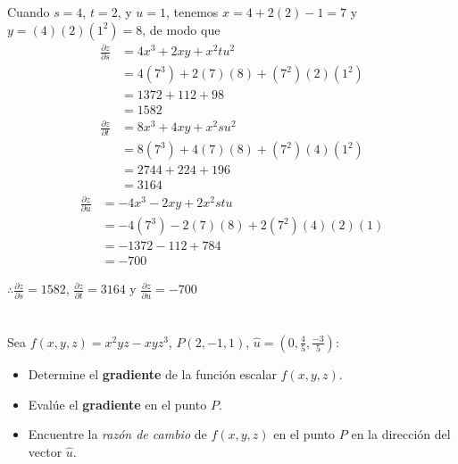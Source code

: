 \documentclass[12pt]{article}
\begin{document}
Cuando $s=4$, $t=2$, y $u=1$, tenemos $x=4+2(2)-1=7$ y $y=(4)(2)(1^2)=8$, de modo que
\begin{align*}
  \frac{\partial z}{\partial s}
  &= 4x^3+2xy + x^2tu^2 \\
  &= 4(7^3)+2(7)(8)+(7^2)(2)(1^2) \\
  &= 1372 + 112 + 98 \\
  &= 1582 
\end{align*}
\begin{align*}
  \frac{\partial z}{\partial t}
  &= 8x^3 + 4xy + x^2su^2 \\
  &= 8(7^3) + 4(7)(8) + (7^2)(4)(1^2) \\
  &= 2744 + 224 + 196 \\
  &=3164
\end{align*}
\begin{align*}
  \frac{\partial z}{\partial u}
  &= -4x^3 - 2xy + 2x^2stu \\
  &= -4(7^3) - 2(7)(8) + 2(7^2)(4)(2)(1) \\
  &= -1372 - 112 + 784 \\
  &= -700
\end{align*}

$\therefore \frac{\partial z}{\partial s}=1582$, $\frac{\partial z}{\partial t} = 3164$ y $ \frac{\partial z}{\partial u} = -700$

\section{}

Sea $f(x, y, z) = x^2yz - xyz^3$, $P(2, -1, 1)$, $\hat{u} = \left (0,\frac{4}{5},\frac{-3}{5} \right)$:

\begin{itemize}[format=\textbf]
  
\item Determine el \textbf{gradiente} de la función escalar $f(x, y, z)$.

\item Evalúe el \textbf{gradiente} en el punto $P$.

\item Encuentre la \textit{razón de cambio} de $f(x, y, z)$ en el punto $P$ en la dirección del vector $\hat{u}$.
\end{itemize}

\end{document}
